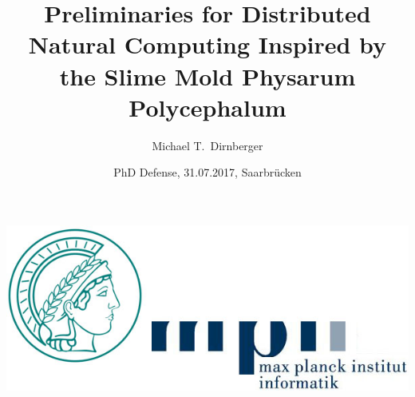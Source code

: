 \documentclass[	hyperref={pdfpagelabels=false}, xcolor=dvipsnames,
		11pt]{beamer}
\title{Preliminaries for Distributed Natural Computing Inspired by the Slime Mold Physarum Polycephalum}
\author{Michael T.\ Dirnberger}
\institute{Max Planck Institute for Informatics}
\date{PhD Defense, 31.07.2017, Saarbr\"ucken\\[2em]}
\begin{document}
\begin{frame}[plain]

\titlepage
\vspace{-1cm}
	    \begin{center}
		\includegraphics[width=0.3\linewidth]{./pics/mpilogo}
	    \end{center}
\end{frame} 












			 
\end{document}
